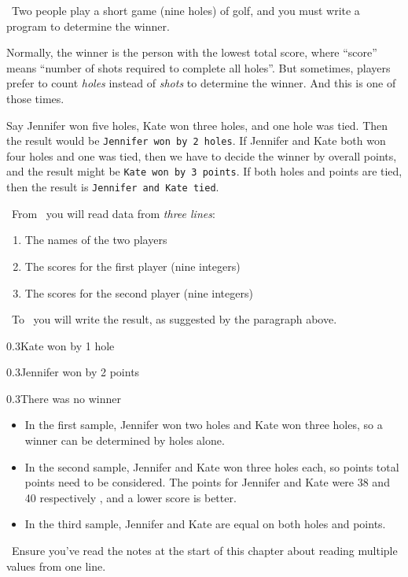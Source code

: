 

\Question\ Two people play a short game (nine holes) of golf, and you must write a program
to determine the winner.

Normally, the winner is the person with the lowest total score, where ``score'' means
``number of shots required to complete all holes''. But sometimes, players prefer to count
\emph{holes} instead of \emph{shots} to determine the winner. And this is one of those
times.

Say Jennifer won five holes, Kate won three holes, and one hole was tied. Then the result
would be \texttt{Jennifer won by 2 holes}. If Jennifer and Kate both won four holes and
one was tied, then we have to decide the winner by overall points, and the result might be
\texttt{Kate won by 3 points}. If both holes and points are tied, then the result is
\texttt{Jennifer and Kate tied}.

\Input\ From \IN\ you will read data from \emph{three lines}:
\begin{enumerate}
  \item The names of the two players
  \item The scores for the first player (nine integers)
  \item The scores for the second player (nine integers)
\end{enumerate}

\Output\ To \OUT\ you will write the result, as suggested by the paragraph above.

\Sample

       {0.3}{Kate won by 1 hole}

\vspace{12pt}
       {0.3}{Jennifer won by 2 points}

\vspace{12pt}
       {0.3}{There was no winner}


\Explanation

\begin{itemize}
  \item In the first sample, Jennifer won two holes and Kate won three holes, so a winner
    can be determined by holes alone.
    \item In the second sample, Jennifer and Kate won three holes each, so points total
      points need to be considered. The points for Jennifer and Kate were 38 and 40
      respectively , and a lower score is better.
    \item In the third sample, Jennifer and Kate are equal on both holes and points.
\end{itemize}

\Scratch\ Ensure you've read the notes at the start of this chapter about reading multiple
values from one line.

